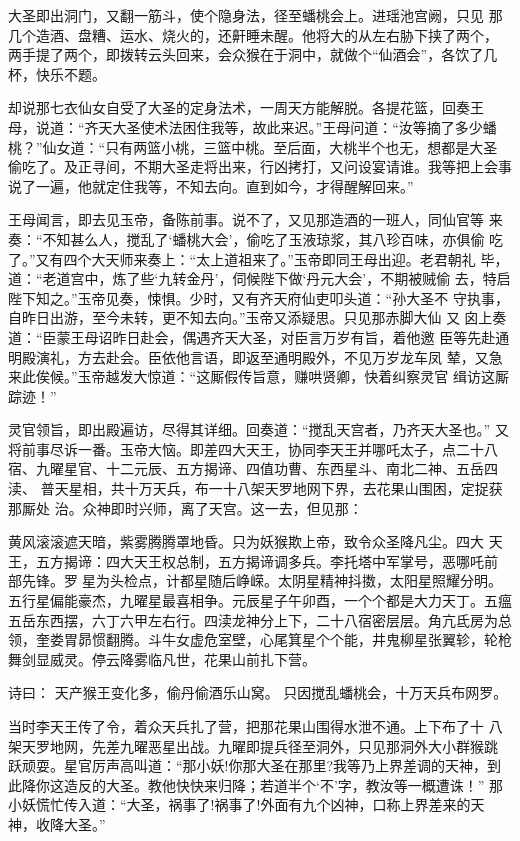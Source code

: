 大圣即出洞门，又翻一筋斗，使个隐身法，径至蟠桃会上。进瑶池宫阙，只见
那几个造酒、盘糟、运水、烧火的，还鼾睡未醒。他将大的从左右胁下挟了两个，
两手提了两个，即拨转云头回来，会众猴在于洞中，就做个“仙酒会”，各饮了几
杯，快乐不题。

却说那七衣仙女自受了大圣的定身法术，一周天方能解脱。各提花篮，回奏王
母，说道：“齐天大圣使术法困住我等，故此来迟。”王母问道：“汝等摘了多少蟠
桃？”仙女道：“只有两篮小桃，三篮中桃。至后面，大桃半个也无，想都是大圣
偷吃了。及正寻间，不期大圣走将出来，行凶拷打，又问设宴请谁。我等把上会事
说了一遍，他就定住我等，不知去向。直到如今，才得醒解回来。”

王母闻言，即去见玉帝，备陈前事。说不了，又见那造酒的一班人，同仙官等
来奏：“不知甚么人，搅乱了‘蟠桃大会’，偷吃了玉液琼浆，其八珍百味，亦俱偷
吃了。”又有四个大天师来奏上：“太上道祖来了。”玉帝即同王母出迎。老君朝礼
毕，道：“老道宫中，炼了些‘九转金丹’，伺候陛下做‘丹元大会’，不期被贼偷
去，特启陛下知之。”玉帝见奏，悚惧。少时，又有齐天府仙吏叩头道：“孙大圣不
守执事，自昨日出游，至今未转，更不知去向。”玉帝又添疑思。只见那赤脚大仙
又囟上奏道：“臣蒙王母诏昨日赴会，偶遇齐天大圣，对臣言万岁有旨，着他邀
臣等先赴通明殿演礼，方去赴会。臣依他言语，即返至通明殿外，不见万岁龙车凤
辇，又急来此俟候。”玉帝越发大惊道：“这厮假传旨意，赚哄贤卿，快着纠察灵官
缉访这厮踪迹！”

灵官领旨，即出殿遍访，尽得其详细。回奏道：“搅乱天宫者，乃齐天大圣也。”
又将前事尽诉一番。玉帝大恼。即差四大天王，协同李天王并哪吒太子，点二十八
宿、九曜星官、十二元辰、五方揭谛、四值功曹、东西星斗、南北二神、五岳四渎、
普天星相，共十万天兵，布一十八架天罗地网下界，去花果山围困，定捉获那厮处
治。众神即时兴师，离了天宫。这一去，但见那：

黄风滚滚遮天暗，紫雾腾腾罩地昏。只为妖猴欺上帝，致令众圣降凡尘。四大
天王，五方揭谛：四大天王权总制，五方揭谛调多兵。李托塔中军掌号，恶哪吒前
部先锋。罗星为头检点，计都星随后峥嵘。太阴星精神抖擞，太阳星照耀分明。
五行星偏能豪杰，九曜星最喜相争。元辰星子午卯酉，一个个都是大力天丁。五瘟
五岳东西摆，六丁六甲左右行。四渎龙神分上下，二十八宿密层层。角亢氐房为总
领，奎娄胃昴惯翻腾。斗牛女虚危室壁，心尾箕星个个能，井鬼柳星张翼轸，轮枪
舞剑显威灵。停云降雾临凡世，花果山前扎下营。

诗曰：
天产猴王变化多，偷丹偷酒乐山窝。
只因搅乱蟠桃会，十万天兵布网罗。

当时李天王传了令，着众天兵扎了营，把那花果山围得水泄不通。上下布了十
八架天罗地网，先差九曜恶星出战。九曜即提兵径至洞外，只见那洞外大小群猴跳
跃顽耍。星官厉声高叫道：“那小妖!你那大圣在那里?我等乃上界差调的天神，到
此降你这造反的大圣。教他快快来归降；若道半个‘不’字，教汝等一概遭诛！”
那小妖慌忙传入道：“大圣，祸事了!祸事了!外面有九个凶神，口称上界差来的天
神，收降大圣。”

